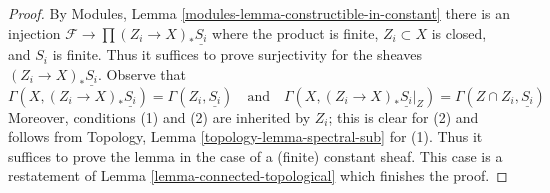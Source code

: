 \begin{proof}
\medskip\noindent
By Modules, Lemma \ref{modules-lemma-constructible-in-constant}
there is an injection $\mathcal{F} \to \prod (Z_i \to X)_*\underline{S_i}$
where the product is finite, $Z_i \subset X$ is closed, and $S_i$ is finite.
Thus it suffices to prove surjectivity for the sheaves
$(Z_i \to X)_*\underline{S_i}$. Observe that
$$
\Gamma(X, (Z_i \to X)_*\underline{S_i}) = \Gamma(Z_i, \underline{S_i})
\quad\text{and}\quad
\Gamma(X, (Z_i \to X)_*\underline{S_i}|_Z) =
\Gamma(Z \cap Z_i, \underline{S_i})
$$
Moreover, conditions (1) and (2) are inherited by $Z_i$; this is clear
for (2) and follows from
Topology, Lemma \ref{topology-lemma-spectral-sub} for (1). Thus it
suffices to prove the lemma in the case of a (finite) constant sheaf.
This case is a restatement of Lemma \ref{lemma-connected-topological}
which finishes the proof.
\end{proof}